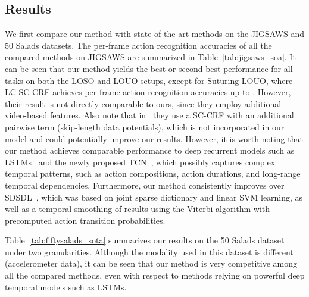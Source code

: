\documentclass[10pt,twocolumn,letterpaper]{article}
\begin{document}
\subsection{Results}

 We first compare our method with state-of-the-art methods on the JIGSAWS and 50 Salads datasets. The per-frame action recognition accuracies of all the compared methods on JIGSAWS are summarized in Table~\ref{tab:jigsaws_soa}. It can be seen that our method yields the best or second best performance for all tasks on both the LOSO and LOUO setups, except for Suturing LOUO, where  LC-SC-CRF achieves per-frame action recognition accuracies up to . However, their result is not directly comparable to ours, since they employ additional video-based features. Also note that in~\cite{Lea:WACV15} they use a SC-CRF with an additional pairwise term (skip-length data potentials), which is not incorporated in our model and could potentially improve our results. However, it is worth noting that our method achieves comparable performance to deep recurrent models such as LSTMs~\cite{Dipietro:MICCAI16} and the newly proposed TCN~\cite{Lea:ECCV16-WBNIMR},  which possibly captures complex temporal patterns, such as action compositions, action durations, and long-range temporal dependencies. Furthermore, our method consistently improves over SDSDL~\cite{Sefati:M2CAI15}, which was based on joint sparse dictionary and linear SVM learning, as well as a temporal smoothing of results using the Viterbi algorithm with precomputed action transition probabilities. 

Table~\ref{tab:fiftysalads_sota} summarizes our results on the 50 Salads dataset under two granularities. Although the modality used in this dataset is different (accelerometer data), it can be seen that our method is very competitive among all the compared methods, even with respect to methods relying on powerful deep temporal models such as LSTMs. 
\end{document}
